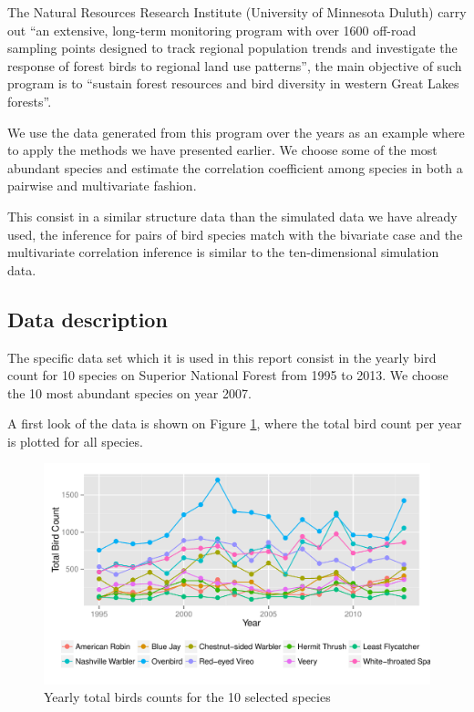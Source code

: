 \documentclass{article}
\begin{document}
The Natural Resources Research Institute (University of Minnesota Duluth) carry out ``an extensive, long-term monitoring program with over 1600 off-road sampling points designed to track regional population trends and investigate the response of forest birds to regional land use patterns'', the main objective of such program is to  ``sustain forest resources and bird diversity in western Great Lakes forests''.

We use the data generated from this program over the years as an example where to apply the methods we have presented earlier. We choose some of the most abundant species and estimate the correlation coefficient among species in both a pairwise and multivariate fashion. 

This consist in a similar structure data than the simulated data we have already used, the inference for pairs of bird species match with the bivariate case and the multivariate correlation inference is similar to the ten-dimensional simulation data. 

\subsection{Data description}
The specific data set which it is used in this report consist in the yearly bird count for 10 species on Superior National Forest from 1995 to 2013.  We choose the 10 most abundant species on year 2007. 

A first look of the data is shown on Figure \ref{figtr}, where the total bird count per year is plotted for all species. 
\begin{figure}[hbpt]
\centering
\includegraphics[width =\textwidth]{rawtrend}
 \vspace{-.5in}
\caption{Yearly total birds counts for the 10 selected species \label{figtr} }
\end{figure}
\end{document}
